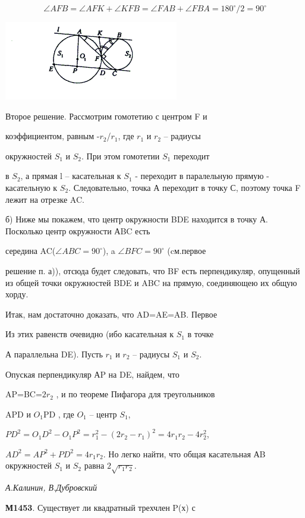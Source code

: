 \begin{multicols}{2}
$$ \angle{AFB} = \angle{AFK} + \angle{KFB} = \angle{FAB} + \angle{FBA} = 180^\circ / 2 = 90 ^\circ $$

\includegraphics {1} 

Второе решение. Рассмотрим гомотетию с центром F и

коэффициентом, равным -$r_2$/$r_1$, где $r_1$ и $r_2$ – радиусы

окружностей $S_1$ и $S_2$. При этом гомотетии $S_1$ переходит

в $S_2$, а прямая l – касательная к $S_1$ - переходит в паралельную прямую - касательную к $S_2$. Следовательно, точка А переходит в точку С, поэтому точка F лежит на отрезке AC.

\vspace { 3mm }

б) Ниже мы покажем, что центр окружности BDE находится в точку А. Посколько центр окружности АBC есть

середина AC($\angle{ABC}=90^\circ$), a $\angle{BFC}=90^\circ$ (cм.первое 

решение п. а)), отсюда будет следовать, что BF есть перпендикуляр, опущенный из общей точки окружностей
BDE и ABC на прямую, соединяющею их общую хорду.

Итак, нам достаточно доказать, что AD=AE=AB. Первое

Из этих равенств очевидно (ибо касательная к $S_1$ в точке

А параллельна DE). Пусть $r_1$ и $r_2$ – радиусы $S_1$ и $S_2$.

Опуская перпендикуляр АP на DE, найдем, что

AP=BC=$2r_2$ , и по теореме Пифагора для треугольников

APD и $O_1$PD , где $O_1$ – центр $S_1$,

$ PD^2 = O_1D^2 - O_1P^2 =r_1^2 - (2r_2-r_1)^2= 4r_1r_2-4r_2^2$,

$ AD^2 = AP^2 + PD^2 = 4r_1r_2$. Но легко найти, что общая касательная АB окружностей $S_1$ и $S_2$ равна $2\sqrt{r_1r_2}$.

\textit{А.Калинин, В.Дубровский}

\vspace { 3mm }

\textbf{М1453}. 
Существует ли квадратный трехчлен P(х) с


\end{multicols}
